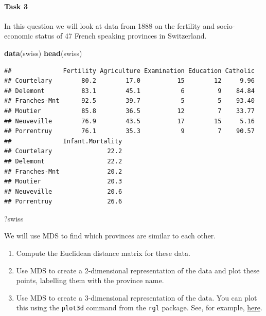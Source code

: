 \documentclass[
]{book}
\newenvironment{Shaded}{\begin{snugshade}}{\end{snugshade}}
\newcommand{\FunctionTok}[1]{\textcolor[rgb]{0.13,0.29,0.53}{\textbf{#1}}}
\newcommand{\NormalTok}[1]{#1}
\theoremstyle{definition}
\theoremstyle{definition}
\theoremstyle{definition}
\theoremstyle{definition}
\theoremstyle{remark}
\begin{document}
\paragraph*{Task 3}\label{task-3-1}

In this question we will look at data from 1888 on the fertility and socio-economic status of 47 French speaking provinces in Switzerland.

\begin{Shaded}
\begin{Highlighting}[]
\FunctionTok{data}\NormalTok{(swiss)}
\FunctionTok{head}\NormalTok{(swiss)}
\end{Highlighting}
\end{Shaded}

\begin{verbatim}
##              Fertility Agriculture Examination Education Catholic
## Courtelary        80.2        17.0          15        12     9.96
## Delemont          83.1        45.1           6         9    84.84
## Franches-Mnt      92.5        39.7           5         5    93.40
## Moutier           85.8        36.5          12         7    33.77
## Neuveville        76.9        43.5          17        15     5.16
## Porrentruy        76.1        35.3           9         7    90.57
##              Infant.Mortality
## Courtelary               22.2
## Delemont                 22.2
## Franches-Mnt             20.2
## Moutier                  20.3
## Neuveville               20.6
## Porrentruy               26.6
\end{verbatim}

\begin{Shaded}
\begin{Highlighting}[]
\NormalTok{?swiss}
\end{Highlighting}
\end{Shaded}

We will use MDS to find which provinces are similar to each other.

\begin{enumerate}
\def\labelenumi{\roman{enumi}.}
\item
  Compute the Euclidean distance matrix for these data.
\item
  Use MDS to create a 2-dimensional representation of the data and plot these points, labelling them with the province name.
\item
  Use MDS to create a 3-dimensional representation of the data. You can plot this using the \texttt{plot3d} command from the \texttt{rgl} package. See, for example, \href{https://rpubs.com/aagarwal29/179912}{here}.
\end{enumerate}
\end{document}
